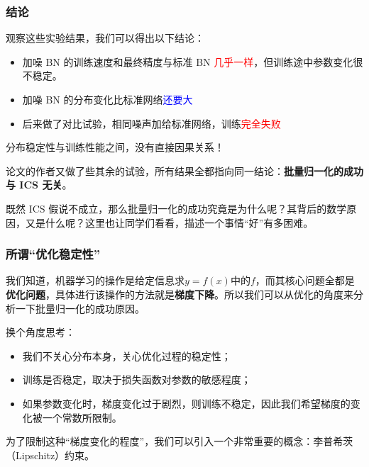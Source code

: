 \documentclass{ctexbeamer}
\begin{document}
%
%

\begin{frame}
    \frametitle{结论}
    
    观察这些实验结果，我们可以得出以下结论：
    \begin{itemize}
        \item 加噪 BN 的训练速度和最终精度与标准 BN \textcolor{red}{几乎一样}，但训练途中参数变化很不稳定。
        \item 加噪 BN 的分布变化比标准网络\textcolor{blue}{还要大}
        \item 后来做了对比试验，相同噪声加给标准网络，训练\textcolor{red}{完全失败}
    \end{itemize}
    分布稳定性与训练性能之间，没有直接因果关系\cite{santurkar2019doesbatchnormalizationhelp}！

    论文的作者又做了些其余的试验，所有结果全都指向同一结论：\textbf{批量归一化的成功与 ICS 无关}。
    
    既然 ICS 假说不成立，那么批量归一化的成功究竟是为什么呢？其背后的数学原因，又是什么呢？这里也让同学们看看，描述一个事情“好”有多困难。

\end{frame}

\begin{frame}
    \frametitle{所谓“优化稳定性”}

    我们知道，机器学习的操作是给定信息求$y = f(x)$中的$f$，而其核心问题全都是\textbf{优化问题}，具体进行该操作的方法就是\textbf{梯度下降}。所以我们可以从优化的角度来分析一下批量归一化的成功原因。

    换个角度思考：
    \begin{itemize}
        \item 我们不关心分布本身，关心优化过程的稳定性；
        \item 训练是否稳定，取决于损失函数对参数的敏感程度；
        \item 如果参数变化时，梯度变化过于剧烈，则训练不稳定，因此我们希望梯度的变化被一个常数所限制。
    \end{itemize}

    为了限制这种“梯度变化的程度”，我们可以引入一个非常重要的概念：李普希茨（Lipschitz）约束。

\end{frame}
\end{document}
